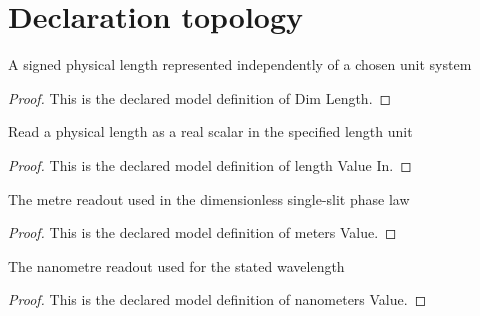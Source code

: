 \section{Declaration topology}
\begin{definition}
  \label{def:physics:phyx-mini-0083:phyxminiproblems-problemphyxmini0083-dimlength}
  A signed physical length represented independently of a chosen unit system
\end{definition}
\begin{proof}
  This is the declared model definition of Dim Length.
\end{proof}
\begin{definition}
  \label{def:physics:phyx-mini-0083:phyxminiproblems-problemphyxmini0083-lengthvaluein}
  Read a physical length as a real scalar in the specified length unit
\end{definition}
\begin{proof}
  This is the declared model definition of length Value In.
\end{proof}
\begin{definition}
  \label{def:physics:phyx-mini-0083:phyxminiproblems-problemphyxmini0083-metersvalue}
  The metre readout used in the dimensionless single-slit phase law
\end{definition}
\begin{proof}
  This is the declared model definition of meters Value.
\end{proof}
\begin{definition}
  \label{def:physics:phyx-mini-0083:phyxminiproblems-problemphyxmini0083-nanometersvalue}
  The nanometre readout used for the stated wavelength
\end{definition}
\begin{proof}
  This is the declared model definition of nanometers Value.
\end{proof}
